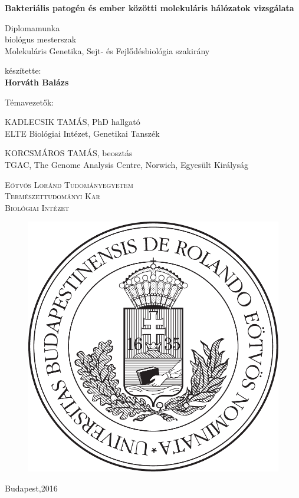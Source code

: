 \documentclass[a4paper,12pt]{article}
\newcommand{\thesistitle}[1]{

	\vspace{48pt}
	\textbf{\noindent \huge {#1}}
	\vspace{24pt}

}
\newcommand{\spec}[1]{

		\Large Diplomamunka \\
		\large biológus mesterszak \\
		\large {#1} szakirány
		\vspace{48pt}
}
\newcommand{\name}[1]{
	\large{készítette:} \\
	\Large\textbf{{#1}}
	\vspace{84pt}
	

}
\newcommand{\consulent}[3]{
	\large{#1}, {#2} \\
	\large{{#3}}
}
\newcommand{\footer}[1]{

	\textsc{Eötvös Loránd Tudományegyetem}\\
	\textsc{Természettudományi Kar}\\
	\textsc{Biológiai Intézet} \\
	
	\begin{figure}[H]
		\centering
		\includegraphics[scale=0.35]{img/elte_cimer_vector.pdf}
	\end{figure}
	
	Budapest,#1


}
\begin{document}
	\thispagestyle{empty}
	
	\begin{center}
			\thesistitle{Bakteriális patogén és ember közötti molekuláris hálózatok vizsgálata}
			
			\spec{Molekuláris Genetika, Sejt- és Fejlődésbiológia}
			
			\name{Horváth Balázs}
			
			\large Témavezetők:
			\vspace{0.21cm}
			
			\consulent{KADLECSIK TAMÁS}{PhD hallgató}{ELTE Biológiai Intézet, Genetikai Tanszék}
			
			\vspace{16pt}
			
			\consulent{KORCSMÁROS TAMÁS}{beosztás}{TGAC, The Genome Analysis Centre, Norwich, Egyesült Királyság}
			
			\vspace{48pt}
			
			\footer{2016}
			
	\end{center}

	
\end{document}

